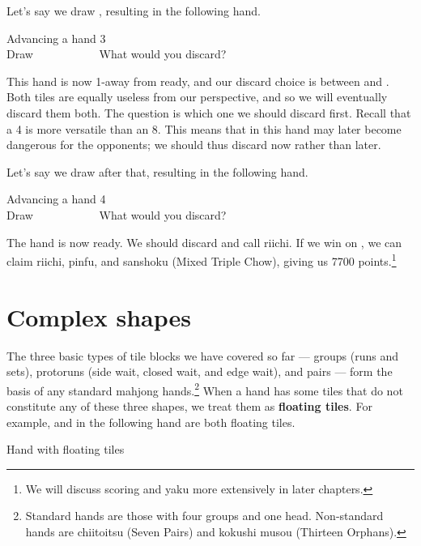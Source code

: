 {\bigskip
Let's say we draw {\LARGE{}}, resulting in the following hand. 
\begin{itembox}[r]{Advancing a hand 3}
\bp
{}~\\
\hfill\footnotesize{Draw~~~~~~~~~~~}
\ep
\vspace{-17pt}What would you discard? \vspace{-5pt}
\end{itembox}
\noindent
This hand is now 1-away from ready, and our discard choice is between {\LARGE{}} and {\LARGE{}}. Both tiles are equally useless from our perspective, and so we will eventually discard them both. The question is which one we should discard first. Recall that a 4 is more versatile than an 8. This means that {\LARGE{}} in this hand may later become dangerous for the opponents; we should thus discard {\LARGE{}} now rather than later. 

\bigskip
Let's say we draw {\LARGE{}} after that, resulting in the following hand.
\begin{itembox}[r]{Advancing a hand 4}
\bp
{}~\\
\hfill\footnotesize{Draw~~~~~~~~~~~}
\ep
\vspace{-17pt}What would you discard? \vspace{-5pt}
\end{itembox}
\noindent
The hand is now ready. We should discard {\LARGE{}} and call riichi. If we win on {\LARGE{}}, we can claim riichi, {\jap pinfu}, and {\jap sanshoku} (Mixed Triple Chow), giving us 7700 points.\footnote{We will discuss scoring and {\jap yaku} more extensively in later chapters.}

\newpage
\section{Complex shapes}
The three basic types of tile blocks we have covered so far --- groups (runs and sets), protoruns (side wait, closed wait, and edge wait), and pairs --- form the basis of any standard mahjong hands.\footnote{Standard hands are those with four groups and one head. Non-standard hands are {\jap chiitoitsu} (Seven Pairs) and {\jap kokushi musou} (Thirteen Orphans).}  
When a hand has some tiles that do not constitute any of these three shapes, we treat them as {\bf floating tiles}. For example, {\LARGE{}} and {\LARGE{}} in the following hand are both floating tiles. 
\bigskip
\begin{itembox}[r]{Hand with floating tiles}
\bp
{}
\ep
\end{itembox}

}
